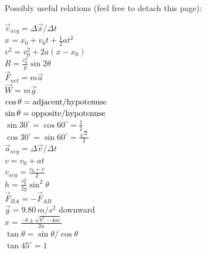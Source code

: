 \documentclass[letterpaper,addpoints,answers]{exam}
\begin{document}
\begin{questions}


\end{questions}

 \pagebreak
 
 {\Large Possibly useful relations (feel free to detach this page):}
  
 \fontseries{\seriesdefault}
 \begin{multicols}{2}
 \Large
 \noindent
 $\vec{v}_{avg} = \Delta\vec{x} / \Delta t$ \\
 $x = x_0 + v_0 t + \frac{1}{2} a t^2$ \\
 $v^2 = v_0^2 + 2 a (x - x_0)$ \\
 $R = \frac{v_0^2}{g}\sin 2\theta$ \\
 $\vec{F}_{net} = m \vec{a}$ \\
 $\vec{W} = m \vec{g}$ \\
 $\cos\theta = \hbox{adjacent}/\hbox{hypotenuse}$ \\
 $\sin\theta = \hbox{opposite}/\hbox{hypotenuse}$ \\
 $\sin 30^\circ = \cos 60^\circ = \frac{1}{2}$ \\
 $\cos 30^\circ = \sin 60^\circ = \frac{\sqrt{3}}{2}$ \\
 
 \noindent
 $\vec{a}_{avg} = \Delta\vec{v} / \Delta t$ \\
 $v = v_0 + a t$ \\
 $v_{avg} = \frac{v_0 + v}{2}$ \\
 $h = \frac{v_0^2}{2 g} \sin^2 \theta$ \\
 $\vec{F}_{BA} = - \vec{F}_{AB}$ \\
 $\vec{g} = 9.80\,m/s^2$ downward \\
 $x = \frac{-b \pm \sqrt{b^2 - 4 a c}}{2 a}$ \\
 $\tan\theta = \sin\theta / \cos\theta$ \\
 $\tan 45^\circ = 1$ \\
 \end{multicols}
\end{document}

